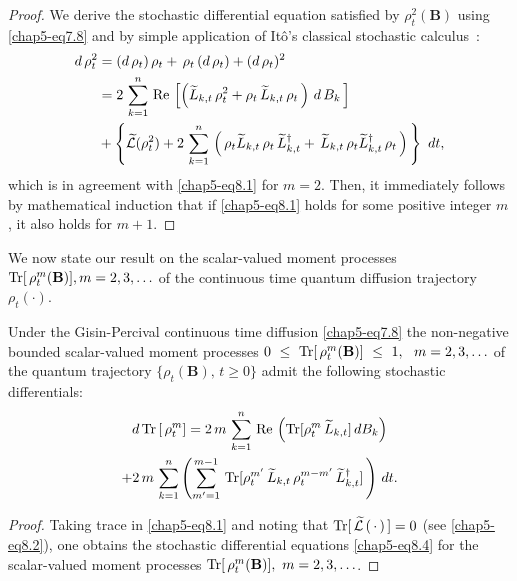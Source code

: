 \begin{proof}
We derive the stochastic differential equation satisfied by $\rho_t^2(\mathbf{B})$  using \eqref{chap5-eq7.8} and by simple application of It\^o's classical stochastic calculus~\cite{key38}: 
\begin{align}
d\, \rho_t^2 & = (d\, \rho_t)\, \rho_t +\, \rho_t\, (d\, \rho_t)+ (d\, \rho_t)^2\nonumber \\ 
&= 2\, \sum_{k=1}^{n}\,  {\rm Re}\, \left[\left(\widetilde{L}_{k,t}\, \rho^{2}_t + \rho_t\, \widetilde{L}_{k,t}\, \rho_t\,\right)\, d\, B_{k}\, \right] \nonumber \\
& + \left\{ \widetilde{\mathcal{L}}(\rho_t^2) + 2\, \sum_{k=1}^{n}\,\left(\, \rho_t \widetilde{L}_{k,t}\, \rho_t\, \widetilde{L}^\dag_{k,t} + \,   \widetilde{L}_{k,t}\,\rho_t \widetilde{L}^\dag_{k,t}\, \rho_t  \, \right) \, \right\}\  dt,  \label{chap5-eq8.3} 
\end{align}
which is in agreement with \eqref{chap5-eq8.1} for $m=2$. Then, it immediately follows by mathematical induction that if \eqref{chap5-eq8.1} holds for some positive integer $m$, it also holds for $m+1$. 
\end{proof}

We now state our result on the scalar-valued moment processes ${\rm Tr}[\, \rho_t^m(\mathbf{B})], m=2,3,\ldots$  of the continuous time quantum diffusion trajectory $\rho_t(\cdot)$.

\begin{thm}\label{chap5-thm4}
Under the Gisin-Percival continuous time diffusion \eqref{chap5-eq7.8} the non-negative bounded scalar-valued  moment processes  $0~\leq~{\rm Tr}[\, \rho_t^m(\mathbf{B})]~\leq~ 1,\ \  m=2,3,\ldots$ of the quantum trajectory $\{\rho_t(\mathbf{B}),\, t\geq 0\}$ admit the following stochastic differentials:
\begin{multline}
d\, {\rm Tr}\,[\, \rho_t^m] = 2\, m\, \sum_{k=1}^n\, {\rm Re}\,\left( {\rm Tr}[\rho_t^m\, \widetilde{L}_{k,t}]\, dB_{k}\right)  \\
+ 2\, m\, \sum_{k=1}^n\left(\sum_{m'=1}^{m-1}\, {\rm Tr}[\rho_t^{m'}\, \widetilde{L}_{k,t}\, \rho_t^{m-m'}\, \widetilde{L}_{k,t}^\dag]\,\right)\, dt.  \label{chap5-eq8.4}
\end{multline}   
\end{thm}

\begin{proof}
Taking trace in \eqref{chap5-eq8.1} and  noting   that ${\rm Tr}[\,\widetilde{\mathcal{L}}\,(\,\cdot\,)\,]=0$ (see \eqref{chap5-eq8.2}), one obtains the stochastic differential equations \eqref{chap5-eq8.4} for the scalar-valued moment processes ${\rm Tr}[\, \rho_t^m(\mathbf{B})],\ m=2,3,\ldots$. 
\end{proof}

